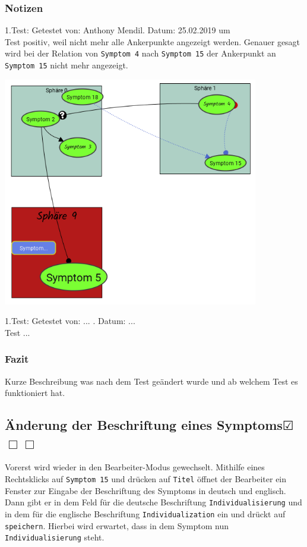 \documentclass{scrartcl}
\newcommand{\subsectiont}[2]{\subsection[#1]{#1{\normalsize\normalfont #2}}}
\newcommand{\leer}{$\Box$}
\newcommand{\ok}{$\CheckedBox$}
\begin{document}
\subsubsection{Notizen}
1.Test: Getestet von: Anthony Mendil. Datum: 25.02.2019 um  \\
Test positiv, weil nicht mehr alle Ankerpunkte angezeigt werden. Genauer gesagt wird bei der Relation von \texttt{Symptom 4} nach \texttt{Symptom 15} der Ankerpunkt an \texttt{Symptom 15} nicht mehr angezeigt. \\
\begin{center}
\includegraphics[height=10cm]{3_43.PNG}
\end{center}
1.Test: Getestet von: ... . Datum: ... \\
Test ...
\subsubsection{Fazit}
Kurze Beschreibung was nach dem Test geändert wurde und ab welchem Test es funktioniert hat. 

\subsectiont{Änderung der Beschriftung eines Symptoms}{\dotfill\ok\leer\leer}
Vorerst wird wieder in den Bearbeiter-Modus gewechselt. Mithilfe eines Rechtsklicks auf \texttt{Symptom 15} und drücken auf \texttt{Titel} öffnet der Bearbeiter ein Fenster zur Eingabe der Beschriftung des Symptoms in deutsch und englisch. Dann gibt er in dem Feld für die deutsche Beschriftung \texttt{Individualisierung}  und in dem für die englische Beschriftung \texttt{Individualization} ein und drückt auf \texttt{speichern}. Hierbei wird erwartet, dass in dem Symptom nun \texttt{Individualisierung} steht. 
\end{document}
